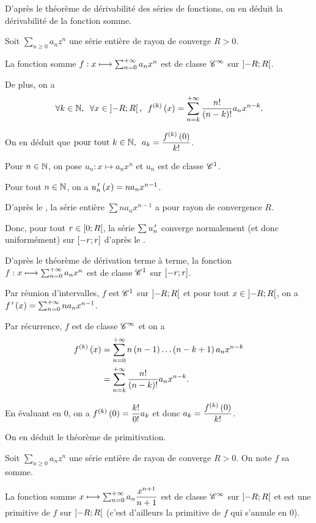 D'après le théorème de dérivabilité des séries de fonctions, on en déduit la dérivabilité de la fonction somme.

\begin{theo}
Soit \(\sum_{n\geq0}a_nz^n\) une série entière de rayon de converge \(R>0\).

La fonction somme \(f:x\longmapsto\sum_{n=0}^{+\infty}a_nx^n\) est de classe \(\mathscr{C}^{\infty}\) sur \(\left]-R;R\right[\).

De plus, on a \[\quantifs{\forall k\in\N;\forall x\in\intervee{-R}{R}}f\deriv{k}\paren{x}=\sum_{n=k}^{\pinf}\dfrac{n!}{\paren{n-k}!}a_nx^{n-k}.\]

On en déduit que \(\quantifs{\tpt k\in\N}a_k=\dfrac{f\deriv{k}\paren{0}}{k!}\).
\end{theo}

\begin{dem}
Pour \(n\in\mathbb{N}\), on pose \(u_n:x\mapsto a_nx^n\) et \(u_n\) est de classe \(\mathscr{C}^{1}\).

Pour tout \(n\in\mathbb{N}\), on a \(u_n^{\,\prime}\left(x\right)=na_nx^{n-1}\).

D'après le , la série entière \(\sum na_nx^{n-1}\) a pour rayon de convergence \(R\).

Donc, pour tout \(r\in\left[0;R\right[\), la série \(\sum u_n^{\,\prime}\) converge normalement (et donc uniformément) sur \(\left[-r;r\right]\) d'après le .

D'après le théorème de dérivation terme à terme, la fonction \(f:x\longmapsto\sum_{n=0}^{+\infty}a_nx^n\) est de classe \(\mathscr{C}^{1}\) sur \(\left[-r;r\right]\).

Par réunion d'intervalles, \(f\) est \(\mathscr{C}^{1}\) sur \(\left]-R;R\right[\) et pour tout \(x\in\left]-R;R\right[\), on a \(f^{\,\prime}\left(x\right)=\sum_{n=0}^{+\infty}na_nx^{n-1}\).

Par récurrence, \(f\) est de classe \(\mathscr{C}^{\infty}\) et on a \[\begin{aligned}
f^{\left(k\right)}\left(x\right)&=\sum_{n=0}^{+\infty}n\left(n-1\right)\dots\left(n-k+1\right)a_nx^{n-k} \\
&=\sum_{n=k}^{+\infty}\dfrac{n!}{\left(n-k\right)!}a_nx^{n-k}.
\end{aligned}\]

En évaluant en \(0\), on a \(f^{\left(k\right)}\left(0\right)=\dfrac{k!}{0!}a_k\) et donc \(a_k=\dfrac{f^{\left(k\right)}\left(0\right)}{k!}\).
\end{dem}

On en déduit le théorème de primitivation.

\begin{theo}
Soit \(\sum_{n\geq0}a_nz^n\) une série entière de rayon de converge \(R>0\). On note \(f\) sa somme.

La fonction somme \(x\longmapsto\sum_{n=0}^{+\infty}a_n\dfrac{x^{n+1}}{n+1}\) est de classe \(\mathscr{C}^{\infty}\) sur \(\left]-R;R\right[\) et est une primitive de \(f\) sur \(\left]-R;R\right[\) (c'est d'ailleurs la primitive de \(f\) qui s'annule en \(0\)).
\end{theo}

